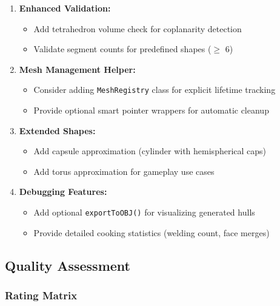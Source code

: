 \begin{enumerate}
    \item \textbf{Enhanced Validation:}
    \begin{itemize}
        \item Add tetrahedron volume check for coplanarity detection
        \item Validate segment counts for predefined shapes ($\geq$ 6)
    \end{itemize}

    \item \textbf{Mesh Management Helper:}
    \begin{itemize}
        \item Consider adding \texttt{MeshRegistry} class for explicit lifetime tracking
        \item Provide optional smart pointer wrappers for automatic cleanup
    \end{itemize}

    \item \textbf{Extended Shapes:}
    \begin{itemize}
        \item Add capsule approximation (cylinder with hemispherical caps)
        \item Add torus approximation for gameplay use cases
    \end{itemize}

    \item \textbf{Debugging Features:}
    \begin{itemize}
        \item Add optional \texttt{exportToOBJ()} for visualizing generated hulls
        \item Provide detailed cooking statistics (welding count, face merges)
    \end{itemize}
\end{enumerate}


\subsection{Quality Assessment}

\subsubsection{Rating Matrix}

